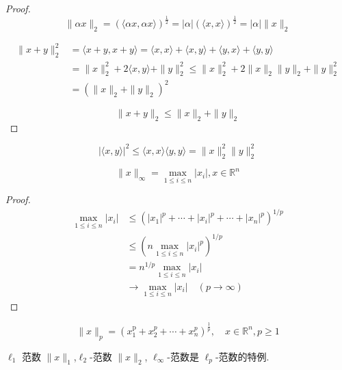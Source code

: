 \begin{proof}
    $$ \|\alpha x\|_{2}=(\langle\alpha x, \alpha x\rangle)^{\frac{1}{2}}=|\alpha|(\langle x, x\rangle)^{\frac{1}{2}}=|\alpha|\|x\|_{2} $$
    
    $$\begin{aligned} \|x+y\|_{2}^{2}&=\langle x+y, x+y\rangle=\langle x, x\rangle+\langle x, y\rangle+\langle y, x\rangle+\langle y, y\rangle  \\
    &=\|x\|_{2}^{2}+2\langle x, y\rangle+\|y\|_{2}^{2} \leq\|x\|_{2}^{2}+2\|x\|_{2}\|y\|_{2}+\|y\|_{2}^{2}\\
    &=\left(\|x\|_{2}+\|y\|_{2}\right)^{2} \end{aligned}$$

    $$ \|x+y\|_{2} \leq\|x\|_{2}+\|y\|_{2} $$
\end{proof}

\begin{corollary}[柯西—施瓦茨不等式]
    $$ |\langle x, y\rangle|^{2} \leq\langle x, x\rangle\langle y, y\rangle=\|x\|_{2}^{2}\|y\|_{2}^{2} $$
\end{corollary}

\begin{definition}
    $$ \|x\|_{\infty}=\max _{1 \leq i \leq n}\left|x_{i}\right|, x \in \mathbb{R}^{n} $$
\end{definition}

\begin{proof}
    $$ \begin{aligned} \max _{1 \leq i \leq n}\left|x_{i}\right| 
        &\leq \left(\left|x_{1}\right|^{p}+\cdots+\left|x_{i}\right|^{p}+\cdots+\left|x_{n}\right|^{p}\right)^{1 / p} \\
        &\leq \left(n \max _{1 \leq i \leq n}\left|x_{i}\right|^{p}\right)^{1 / p}\\
        &  =n^{1 / p} \max _{1 \leq i \leq n}\left|x_{i}\right| \\ &\rightarrow \max _{1 \leq i \leq n}\left|x_{i}\right| \quad(p \rightarrow \infty)\end{aligned}
    $$
\end{proof}

\begin{definition}
    $$ \|x\|_{p}=\left(x_{1}^{\mathrm{p}}+x_{2}^{p}+\cdots+x_{n}^{p}\right)^{\frac{1}{p}}, \quad x \in \mathbb{R}^{n}, p \ge 1 $$

    $ \ell_{1} $ 范数 $ \|x\|_{1}$,$ \ell_{2} $-范数 $ \|x\|_{2} $, $ \ell_{\infty} $-范数是 $ \ell_{p} $-范数的特例. 
\end{definition}

